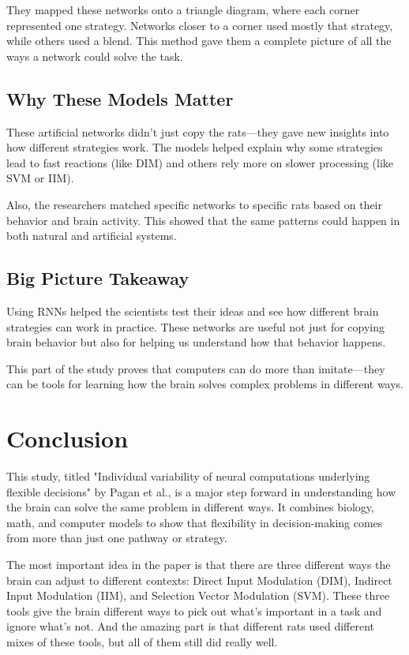 \documentclass{article}
\begin{document}
They mapped these networks onto a triangle diagram, where each corner represented one strategy. Networks closer to a corner used mostly that strategy, while others used a blend. This method gave them a complete picture of all the ways a network could solve the task.

\subsection{Why These Models Matter}
These artificial networks didn’t just copy the rats—they gave new insights into how different strategies work. The models helped explain why some strategies lead to fast reactions (like DIM) and others rely more on slower processing (like SVM or IIM).

Also, the researchers matched specific networks to specific rats based on their behavior and brain activity. This showed that the same patterns could happen in both natural and artificial systems.

\subsection{Big Picture Takeaway}
Using RNNs helped the scientists test their ideas and see how different brain strategies can work in practice. These networks are useful not just for copying brain behavior but also for helping us understand how that behavior happens.

This part of the study proves that computers can do more than imitate—they can be tools for learning how the brain solves complex problems in different ways.


\section{Conclusion}

This study, titled "Individual variability of neural computations underlying flexible decisions" by Pagan et al., is a major step forward in understanding how the brain can solve the same problem in different ways. It combines biology, math, and computer models to show that flexibility in decision-making comes from more than just one pathway or strategy.

The most important idea in the paper is that there are three different ways the brain can adjust to different contexts: Direct Input Modulation (DIM), Indirect Input Modulation (IIM), and Selection Vector Modulation (SVM). These three tools give the brain different ways to pick out what's important in a task and ignore what’s not. And the amazing part is that different rats used different mixes of these tools, but all of them still did really well.
\end{document}
